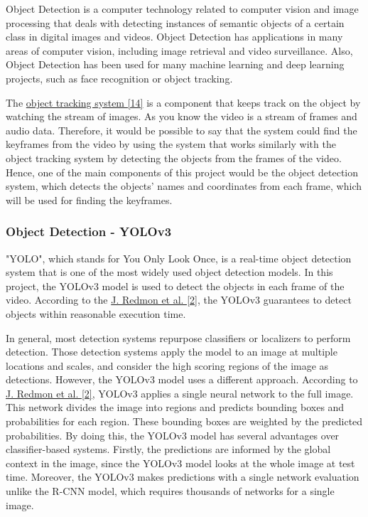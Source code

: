 \documentclass{article}
\begin{document}
Object Detection is a computer technology related to computer vision and image processing that deals with detecting instances of semantic objects of a certain class in digital images and videos. Object Detection has applications in many areas of computer vision, including image retrieval and video surveillance. Also, Object Detection has been used for many machine learning and deep learning projects, such as face recognition or object tracking.

The \hyperlink{ref14}{object tracking system [14]} is a component that keeps track on the object by watching the stream of images. As you know the video is a stream of frames and audio data. Therefore, it would be possible to say that the system could find the keyframes from the video by using the system that works similarly with the object tracking system by detecting the objects from the frames of the video. Hence, one of the main components of this project would be the object detection system, which detects the objects' names and coordinates from each frame, which will be used for finding the keyframes.

\subsubsection{Object Detection - YOLOv3}

"YOLO", which stands for You Only Look Once, is a real-time object detection system that is one of the most widely used object detection models. In this project, the YOLOv3 model is used to detect the objects in each frame of the video. According to the \hyperlink{ref2}{J. Redmon et al. [2]}, the YOLOv3 guarantees to detect objects within reasonable execution time.

In general, most detection systems repurpose classifiers or localizers to perform detection. Those detection systems apply the model to an image at multiple locations and scales, and consider the high scoring regions of the image as detections. However, the YOLOv3 model uses a different approach. According to \hyperlink{ref2}{J. Redmon et al. [2]}, YOLOv3 applies a single neural network to the full image. This network divides the image into regions and predicts bounding boxes and probabilities for each region. These bounding boxes are weighted by the predicted probabilities. By doing this, the YOLOv3 model has several advantages over classifier-based systems. Firstly, the predictions are informed by the global context in the image, since the YOLOv3 model looks at the whole image at test time. Moreover, the YOLOv3 makes predictions with a single network evaluation unlike the R-CNN model, which requires thousands of networks for a single image.
\end{document}
